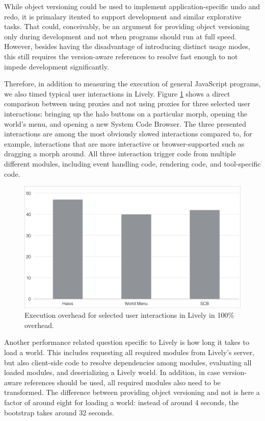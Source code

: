 While object versioning could be used to implement application-specific undo and redo, it is primalary itented to support development and similar explorative tasks.
That could, conceivably, be an argument for providing object versioning only during development and not when programs should run at full speed.
However, besides having the disadvantage of introducing distinct usage modes, this still requires the version-aware references to resolve fast enough to not impede development significantly.

Therefore, in addition to measuring the execution of general JavaScript programs, we also timed typical user interactions in Lively.
Figure \ref{fig:LivelyInteractionsOverhead} shows a direct comparison between using proxies and not using proxies for three selected user interactions: bringing up the halo buttons on a particular morph, opening the world's menu, and opening a new System Code Browser.
The three presented interactions are among the most obviously slowed interactions compared to, for example, interactions that are more interactive or browser-supported such as dragging a morph around.
All three interaction trigger code from multiple different modules, including event handling code, rendering code, and tool-specific code.

\begin{figure}[h]
    \centering
    \includegraphics[width=\textwidth]{figures/livelyInteractionsOverhead.pdf}
    \caption{Execution overhead for selected user interactions in Lively in 100\% overhead.}
    \label{fig:LivelyInteractionsOverhead}
\end{figure}

Another performance related question specific to Lively is how long it takes to load a world.
This includes requesting all required modules from Lively's server, but also client-side code to resolve dependencies among modules, evaluating all loaded modules, and deserializing a Lively world.
In addition, in case version-aware references should be used, all required modules also need to be transformed.
The difference between providing object versioning and not is here a factor of around eight for loading a world: instead of around 4 seconds, the bootstrap takes around 32 seconds.

